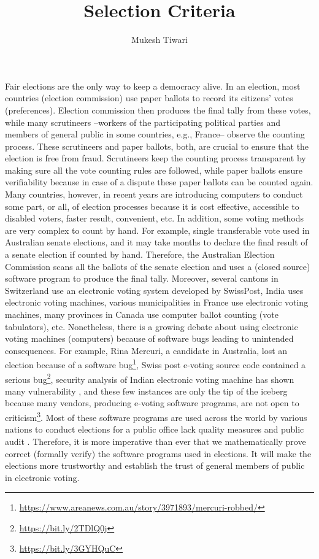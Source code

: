 \documentclass[a4paper]{article}
\title{Selection Criteria}
\author{Mukesh Tiwari}
\date{}
\begin{document}
\fontsize{12}{15}
\selectfont
\maketitle










Fair elections are the only way to keep a democracy alive. In an election, most countries (election commission) use paper ballots to record 
its citizens' votes (preferences). Election commission then produces the final tally from these votes, 
while many scrutineers --workers of the participating political parties and members of general 
public in some countries, e.g., France-- observe the counting process. 
These scrutineers and paper ballots, both, are crucial to ensure that 
the election is free from fraud. Scrutineers keep the counting process transparent by making sure all the vote counting 
rules are followed, while paper ballots ensure verifiability because in case of a dispute these paper ballots 
can be counted again. Many countries, however, in recent years are introducing computers to conduct some part, or all, of 
election processes because it is cost effective, accessible to disabled voters, faster result, convenient, etc. 
In addition, some voting methods are very complex to count by hand. For example,
single transferable vote used in Australian senate elections, and it may take months to declare the final result of 
a senate election if 
counted by hand. Therefore, the Australian Election Commission scans all the ballots of the senate election and 
uses a (closed source) software program to produce the final tally. Moreover, several cantons in Switzerland use an electronic 
voting system developed by SwissPost, India uses electronic voting machines, various municipalities in France 
use electronic voting machines, many provinces in Canada use computer ballot counting (vote tabulators), 
etc.  Nonetheless, there is a growing debate about using electronic voting machines (computers)
because of software bugs leading to unintended consequences. For example, Rina Mercuri, 
a candidate in Australia, lost an election because of 
a software bug\footnote{\url{https://www.areanews.com.au/story/3971893/mercuri-robbed/}}, 
Swiss post e-voting source code contained a serious 
bug\footnote{\url{https://bit.ly/2TDlQ0j}}, security analysis of Indian electronic 
voting machine has shown many vulnerability \cite{Wolchok:2010:SAI:1866307.1866309}, and 
these few instances are only the tip of the iceberg because many vendors, producing 
e-voting software programs, are not open to criticism\footnote{\url{https://bit.ly/3GYHQuC}}.
Most of 
these software programs are used across the world by various nations to conduct elections for a public office 
lack quality measures and public audit \cite{10.1145/3014812.3014837, 9152765, AEC:2013:LMM}. 
Therefore, it is more imperative than ever  that  we mathematically prove correct (formally verify)  the software programs 
used in elections. It will make the elections more trustworthy and establish the trust of general members of public
in electronic voting.
\end{document}
